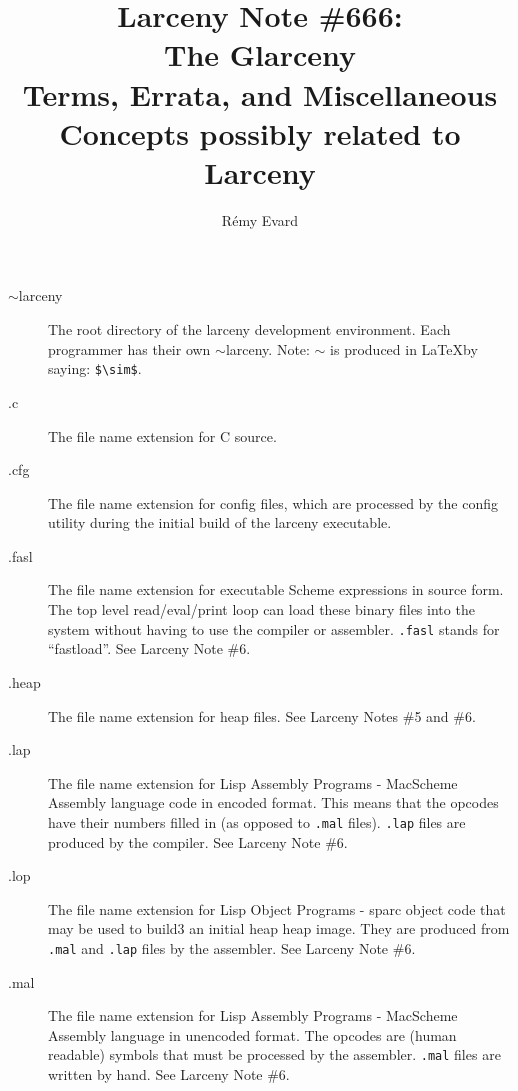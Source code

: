

\title{Larceny Note \#666: \\
       The Glarceny\\
       {\tenrm Terms, Errata, and Miscellaneous Concepts possibly related 
         to Larceny}}
\author{R\'{e}my Evard}


\maketitle

\begin{description}
\item[$\sim$larceny]
The root directory of the larceny development environment.  Each
programmer has their own $\sim$larceny.  Note: $\sim$ is produced in
\LaTeX by saying: {\tt\${\verb+\+}sim\$}.

\item[.c]
The file name extension for C source.

\item[.cfg]
The file name extension for config files, which are processed by
the config utility during the initial build of the larceny executable.

\item[.fasl]
The file name extension for executable Scheme expressions in source form.
The top level read/eval/print loop can load these binary files into the 
system without having
to use the compiler or assembler.  {\tt .fasl} stands for ``fastload''.
See Larceny Note \#6.

\item[.heap]
The file name extension for heap files.
See Larceny Notes \#5 and \#6.

\item[.lap]
The file name extension for Lisp Assembly Programs - MacScheme Assembly
language code in encoded format.  This means that the opcodes have their
numbers filled in (as opposed to {\tt .mal} files).  {\tt .lap} files
are produced by the compiler.
See Larceny Note \#6.

\item[.lop]
The file name extension for Lisp Object Programs - sparc object code that 
may be used to build3 an initial heap heap image.  They are produced from 
{\tt .mal} and {\tt .lap} files by the assembler. 
See Larceny Note \#6.

\item[.mal]
The file name extension for Lisp Assembly Programs - MacScheme Assembly
language in unencoded format.  The opcodes are (human readable) symbols 
that must be processed by the assembler.  {\tt .mal} files are written
by hand.
See Larceny Note \#6.


\end{description}
